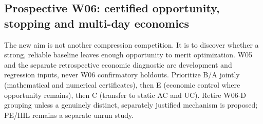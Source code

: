 \subsection{Prospective W06: certified opportunity, stopping and multi-day economics}
\label{sec:w06}
The new aim is not another compression competition. It is to discover whether a strong, reliable baseline leaves enough opportunity to merit optimization. W05 and the separate retrospective economic diagnostic are development and regression inputs, never W06 confirmatory holdouts. Prioritize B/A jointly (mathematical and numerical certificates), then E (economic control where opportunity remains), then C (transfer to static AC and UC). Retire W06-D grouping unless a genuinely distinct, separately justified mechanism is proposed; PE/HIL remains a separate unrun study.

